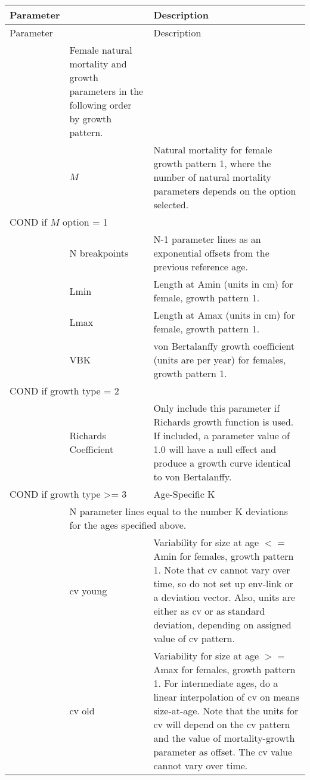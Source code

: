 \begin{longtable}{p{1cm} p{2.25cm} p{10cm}}
	\hline
	Parameter & & Description \Tstrut\Bstrut\\
	\hline
	\endfirsthead

	\hline
	Parameter & & Description \Tstrut\Bstrut\\
	\hline
	\endhead

	\hline
	\endfoot

	\endlastfoot

	\multicolumn{2}{l}{Females}\Tstrut & Female natural mortality and growth parameters in the following order by growth pattern. \\
	& $M$ & Natural mortality for female growth pattern 1, where the number of natural mortality parameters depends on the option selected. \Bstrut\\
	\hline
	\multicolumn{2}{l}{COND if $M$ option = 1} & \Tstrut\\
	& N breakpoints & N-1 parameter lines as an exponential offsets from the previous reference age. \Bstrut\\
	\hline

	& Lmin & Length at Amin (units in cm) for female, growth pattern 1. \\
	& Lmax & Length at Amax (units in cm) for female, growth pattern 1. \\
	& VBK & von Bertalanffy growth coefficient (units are per year) for females, growth pattern 1. \Bstrut\\
	\hline

	\multicolumn{2}{l}{COND if growth type = 2} & \Tstrut\\
	& Richards Coefficient & Only include this parameter if Richards growth function is used. If included, a parameter value of 1.0 will have a null effect and produce a growth curve identical to von Bertalanffy. \\

	\multicolumn{2}{l}{COND if growth type >= 3} & Age-Specific K \\
	& \multicolumn{2}{l}{N parameter lines equal to the number K deviations for the ages specified above.} \Bstrut\\
	\hline

	\Tstrut & \gls{cv} young & Variability for size at age $<=$ Amin for females, growth pattern 1. Note that \gls{cv} cannot vary over time, so do not set up env-link or a deviation vector. Also, units are either as \gls{cv} or as standard deviation, depending on assigned value of \gls{cv} pattern. \\
	& \gls{cv} old & Variability for size at age $>=$ Amax for females, growth pattern 1. For intermediate ages, do a linear interpolation of \gls{cv} on means size-at-age. Note that the units for \gls{cv} will depend on the \gls{cv} pattern and the value of mortality-growth parameter as offset. The \gls{cv} value cannot vary over time. \Bstrut\\
	\hline


\end{longtable}
